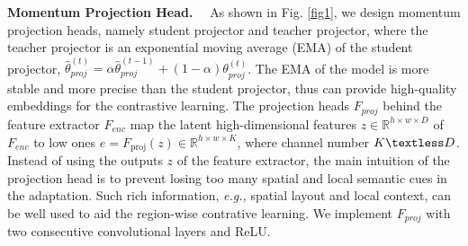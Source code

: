 \documentclass{article}
\renewcommand{\paragraph}[1]{\noindent\textbf{#1}~~}
\begin{document}
\paragraph{Momentum Projection Head.}
As shown in Fig. \ref{fig1}, we design momentum projection heads, namely student projector and teacher projector, where the teacher projector is an exponential moving average (EMA) of the student projector, $\hat \theta_{proj}^{(t)}=\alpha\hat \theta_{proj}^{(t-1)}+(1-\alpha)\theta_{proj}^{(t)}$. The EMA of the model is more stable and more precise than the student projector, thus can provide high-quality embeddings for the contrastive learning.
The projection heads $F_{proj}$
behind the feature extractor $F_{enc}$ map the latent high-dimensional features $z \in \mathbb{R}^{h \times w \times D}$ of $F_{enc}$ to low ones $e=F_{\mathrm{proj}}(z) \in \mathbb{R}^{h \times w \times K}$, where channel number $K \textless D$. 
Instead of using the outputs $z$ of the feature extractor, the main intuition of the projection head is to prevent losing too many  spatial and local semantic cues in the adaptation. Such rich information, \emph{e.g.,}  spatial layout and local context, can be well used to aid the region-wise contrative learning.
We implement $F_{proj}$ with two consecutive convolutional layers and ReLU. 
\end{document}
